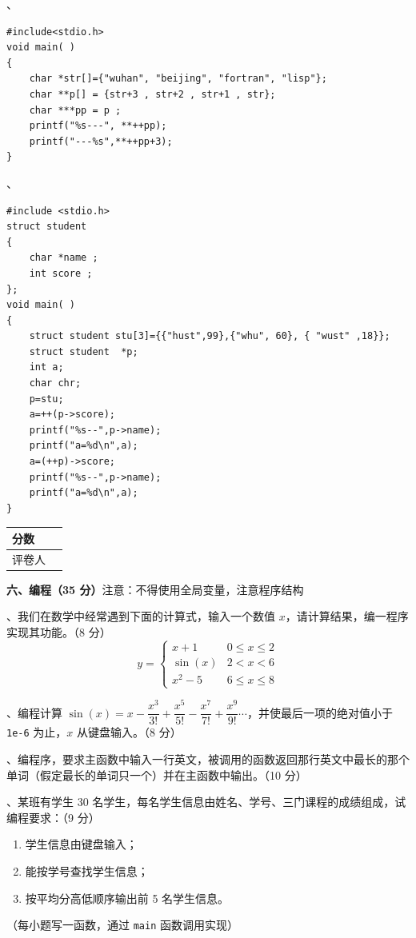 \documentclass[a4paper,11pt]{ctexart}
\newcommand{\secbox}[2]{%
  \noindent\begin{tabular}{|>{\centering\arraybackslash}m{1.5cm}|>{\centering\arraybackslash}m{1.5cm}|}
    \hline
    分\quad 数 & \\ \hline
    评卷人 & \\ \hline
  \end{tabular}\hspace{0.8em}%
  \begin{minipage}[c]{\dimexpr\textwidth-4.2cm\relax}
    \textbf{#1}#2
  \end{minipage}\par\vspace{0.5em}%
}
\begin{document}
\vspace{4pt}
、
\begin{lstlisting}
#include<stdio.h>
void main( )
{
    char *str[]={"wuhan", "beijing", "fortran", "lisp"};
    char **p[] = {str+3 , str+2 , str+1 , str};
    char ***pp = p ;
    printf("%s---", **++pp);
    printf("---%s",**++pp+3);
}
\end{lstlisting}

\vspace{4pt}
、
\begin{lstlisting}
#include <stdio.h>
struct student
{
    char *name ;
    int score ;
};
void main( )
{
    struct student stu[3]={{"hust",99},{"whu", 60}, { "wust" ,18}};
    struct student  *p;
    int a;
    char chr;
    p=stu;
    a=++(p->score);
    printf("%s--",p->name);
    printf("a=%d\n",a);
    a=(++p)->score;
    printf("%s--",p->name);
    printf("a=%d\n",a);
}
\end{lstlisting}

\vspace{8pt}

\secbox{六、编程（35 分）}{注意：不得使用全局变量，注意程序结构}

、我们在数学中经常遇到下面的计算式，输入一个数值 $x$，请计算结果，编一程序实现其功能。（8 分）
\[
y = \begin{cases}
x + 1 & 0 \le x \le 2 \\
\sin(x) & 2 < x < 6 \\
x^2 - 5 & 6 \le x \le 8
\end{cases}
\]

、编程计算 $\sin(x) = x - \dfrac{x^3}{3!} + \dfrac{x^5}{5!} - \dfrac{x^7}{7!} + \dfrac{x^9}{9!}\cdots$，并使最后一项的绝对值小于 \texttt{1e-6} 为止，$x$ 从键盘输入。（8 分）

\vspace{4pt}
、编程序，要求主函数中输入一行英文，被调用的函数返回那行英文中最长的那个单词（假定最长的单词只一个）并在主函数中输出。（10 分）

\vspace{4pt}
、某班有学生 30 名学生，每名学生信息由姓名、学号、三门课程的成绩组成，试编程要求：（9 分）
\begin{enumerate}[label=(\arabic*), leftmargin=2.2em, itemsep=2pt, topsep=2pt]
  \item 学生信息由键盘输入；
  \item 能按学号查找学生信息；
  \item 按平均分高低顺序输出前 5 名学生信息。
\end{enumerate}
（每小题写一函数，通过 \texttt{main} 函数调用实现）
\end{document}
